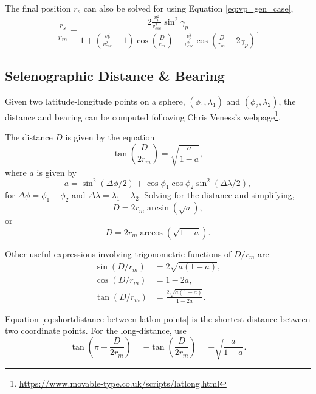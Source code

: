 \documentclass{article}
\begin{document}
The final position $r_s$ can also be solved for using Equation \eqref{eq:vp_gen_case},
\begin{equation}
\frac{r_s}{r_m} = \frac{2\frac{v_p^2}{v_{esc}^2}\sin^2\gamma_p}{1 + \left(\frac{v_p^2}{v_{esc}^2}-1\right)\cos\left(\frac{D}{r_m}\right) - \frac{v_p^2}{v_{esc}^2}\cos\left(\frac{D}{r_m} - 2\gamma_p\right)}.
\end{equation}

\subsection{Selenographic Distance \& Bearing}\label{ssec:Selenographic Distance/Bearing}


Given two latitude-longitude points on a sphere, $(\phi_1, \lambda_1)$ and $(\phi_2, \lambda_2)$, the distance and bearing can be computed following Chris Veness's webpage\footnote{\url{https://www.movable-type.co.uk/scripts/latlong.html}}.

The distance $D$ is given by the equation
\begin{equation}\label{eq:shortdistance-between-latlon-points}
\tan\left(\frac{D}{2r_m}\right) = \sqrt{\frac{a}{1-a}},
\end{equation}
where $a$ is given by
\begin{equation}
a = \sin^2(\Delta\phi/2) + \cos\phi_1\cos\phi_2\sin^2(\Delta\lambda/2),
\end{equation}
for $\Delta\phi = \phi_1-\phi_2$ and $\Delta\lambda = \lambda_1-\lambda_2$. Solving for the distance and simplifying,
\begin{equation}
D = 2r_m\arcsin(\sqrt{a}),
\end{equation}
or
\begin{equation}
D = 2r_m\arccos(\sqrt{1-a}).
\end{equation}

Other useful expressions involving trigonometric functions of $D/r_m$ are
\begin{align}
\sin(D/r_m) &= 2\sqrt{a(1-a)},\\
\cos(D/r_m) &= 1-2a,\\
\tan(D/r_m) &= \frac{2\sqrt{a(1-a)}}{1-2a}.
\end{align}

Equation \eqref{eq:shortdistance-between-latlon-points} is the shortest distance between two coordinate points. For the long-distance, use
\begin{equation}
\tan\left(\pi-\frac{D}{2r_m}\right) = -\tan\left(\frac{D}{2r_m}\right) = -\sqrt{\frac{a}{1-a}}.
\end{equation}
\end{document}
